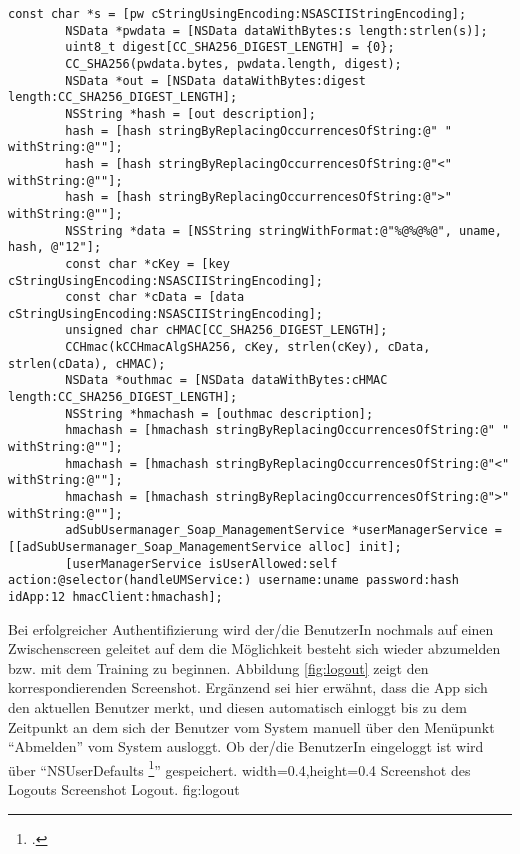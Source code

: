 \begin{lstlisting}[caption=Objective-C Code zur Erstellung des Hashs, label=listing:hash]
        const char *s = [pw cStringUsingEncoding:NSASCIIStringEncoding];
        NSData *pwdata = [NSData dataWithBytes:s length:strlen(s)];
        uint8_t digest[CC_SHA256_DIGEST_LENGTH] = {0};
        CC_SHA256(pwdata.bytes, pwdata.length, digest);
        NSData *out = [NSData dataWithBytes:digest length:CC_SHA256_DIGEST_LENGTH];
        NSString *hash = [out description];
        hash = [hash stringByReplacingOccurrencesOfString:@" " withString:@""];
        hash = [hash stringByReplacingOccurrencesOfString:@"<" withString:@""];
        hash = [hash stringByReplacingOccurrencesOfString:@">" withString:@""];
        NSString *data = [NSString stringWithFormat:@"%@%@%@", uname, hash, @"12"];
        const char *cKey = [key cStringUsingEncoding:NSASCIIStringEncoding];
        const char *cData = [data cStringUsingEncoding:NSASCIIStringEncoding];
        unsigned char cHMAC[CC_SHA256_DIGEST_LENGTH];
        CCHmac(kCCHmacAlgSHA256, cKey, strlen(cKey), cData, strlen(cData), cHMAC);
        NSData *outhmac = [NSData dataWithBytes:cHMAC length:CC_SHA256_DIGEST_LENGTH];
        NSString *hmachash = [outhmac description];
        hmachash = [hmachash stringByReplacingOccurrencesOfString:@" " withString:@""];
        hmachash = [hmachash stringByReplacingOccurrencesOfString:@"<" withString:@""];
        hmachash = [hmachash stringByReplacingOccurrencesOfString:@">" withString:@""];
        adSubUsermanager_Soap_ManagementService *userManagerService = [[adSubUsermanager_Soap_ManagementService alloc] init];
        [userManagerService isUserAllowed:self action:@selector(handleUMService:) username:uname password:hash idApp:12 hmacClient:hmachash];
\end{lstlisting} 

Bei erfolgreicher Authentifizierung wird der/die BenutzerIn nochmals auf einen Zwischenscreen geleitet auf 
dem die Möglichkeit besteht sich wieder abzumelden bzw. mit dem Training zu beginnen. Abbildung \ref{fig:logout} zeigt
den korrespondierenden Screenshot. Ergänzend sei hier erwähnt, dass die App sich den aktuellen Benutzer merkt, und diesen automatisch einloggt bis zu
dem Zeitpunkt an dem sich der Benutzer vom System manuell über den Menüpunkt \enquote{Abmelden} vom System 
ausloggt. Ob der/die BenutzerIn eingeloggt ist wird über \enquote{NSUserDefaults \footcite{https://developer.apple.com/library/mac/documentation/cocoa/Reference/Foundation/Classes/NSUserDefaults_Class/Reference/Reference.html}}
gespeichert.
  {width=0.4\textwidth,height=0.4\textheight}%
  {Screenshot des Logouts}%
  {Screenshot Logout.}%
  {fig:logout}%
  
